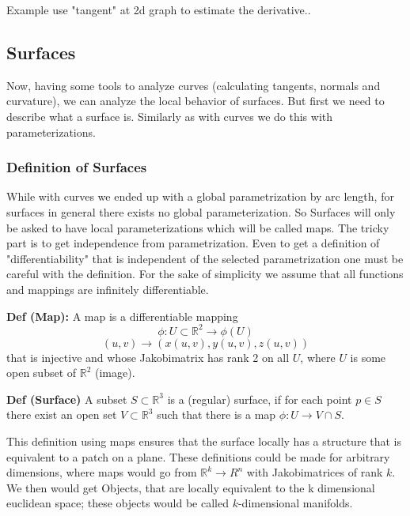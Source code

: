 	Example use "tangent" at 2d graph to estimate the derivative..
	
\subsection{Surfaces}

	Now, having some tools to analyze curves (calculating tangents, normals and curvature), we can analyze the local behavior of surfaces. But first we need to describe what a surface is. Similarly as with curves we do this with parameterizations. 
	
\subsubsection{Definition of Surfaces}	
While with curves we ended up with a global parametrization by arc length, for surfaces in general there exists no global parameterization.
	So Surfaces will only be asked to have local parameterizations which will be called maps. The tricky part is to get independence from parametrization. Even to get a definition of "differentiability" that is independent of the selected parametrization one must be careful with the definition. For the sake of simplicity we assume that all functions and mappings are infinitely differentiable.

\textbf{Def (Map):} A map is a differentiable mapping 
\[\phi: U \subset \mathbb R^2 \rightarrow \phi(U)\] 
\[(u,v) \rightarrow (x(u,v),y(u,v),z(u,v))\]
that is injective and whose Jakobimatrix has rank 2 on all $U$, where $U$ is some open subset of $\mathbb R^2$ (image).


\textbf{Def (Surface)} A subset $S\subset \mathbb R^3$ is a (regular) surface, if for each point $p \in S$ there exist an open set $V\subset \mathbb R^3$ such that there is a map $\phi: U \rightarrow  V\cap S$.

This definition using maps ensures that the surface locally has a structure that is equivalent to a patch on a plane. 
These definitions could be made for arbitrary dimensions, where maps would go from $\mathbb R^k \rightarrow R^n$ with Jakobimatrices of rank $k$. We then would get Objects, that are locally equivalent to the k dimensional euclidean space; these objects would be called $k$-dimensional manifolds.

